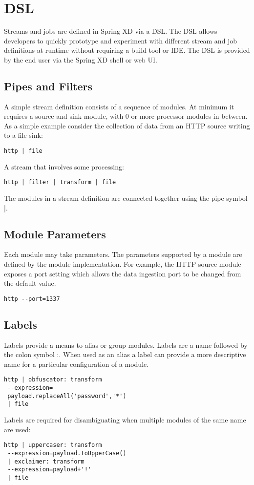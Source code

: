 \section{DSL}
\label{sec:DSL}
Streams and jobs are defined in Spring XD via a DSL\cite{dsl}. The DSL allows developers
to quickly prototype and experiment with different stream and job definitions at
runtime without requiring a build tool or IDE. The DSL is provided by the end user
via the Spring XD shell or web UI.

\subsection {Pipes and Filters}
A simple stream definition consists of a sequence of modules. At minimum it requires a
source and sink module, with 0 or more processor modules in between. As a simple example
consider the collection of data from an HTTP source writing to a file sink:

\begin{lstlisting}
http | file
\end{lstlisting}

A stream that involves some processing:

\begin{lstlisting}
http | filter | transform | file
\end{lstlisting}

The modules in a stream definition are connected together using the pipe symbol |.

\subsection{Module Parameters}
Each module may take parameters. The parameters supported by a module are defined by
the module implementation. For example, the HTTP source module exposes a port setting
which allows the data ingestion port to be changed from the default value.

\begin{lstlisting}
http --port=1337
\end{lstlisting}

\subsection{Labels}

Labels provide a means to alias or group modules. Labels are a name followed
by the colon symbol :. When used as an alias a label can provide a more descriptive
name for a particular configuration of a module.

\begin{lstlisting}
http | obfuscator: transform
 --expression=
 payload.replaceAll('password','*')
 | file
\end{lstlisting}

Labels are required for disambiguating when multiple modules of the same name are used:

\begin{lstlisting}
http | uppercaser: transform
 --expression=payload.toUpperCase()
 | exclaimer: transform 
 --expression=payload+'!'
 | file
\end{lstlisting}

